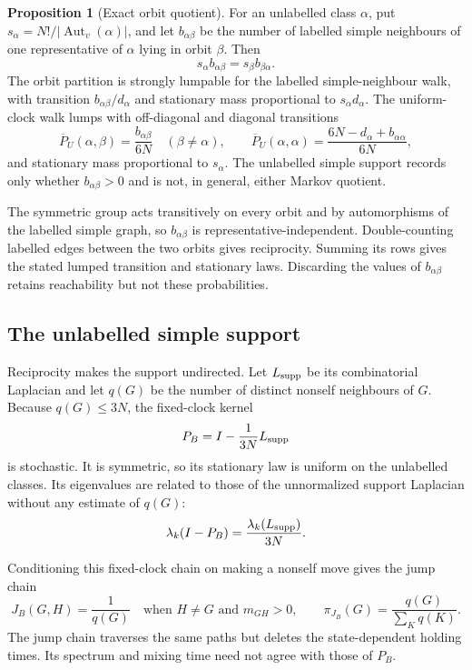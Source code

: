 \documentclass[11pt]{article}
\makeatletter
\newcommand{\Aut}{\operatorname{Aut}}
\theoremstyle{definition}
\newtheorem{proposition}[theorem]{Proposition}
\renewenvironment{proof}[1][\proofname]{\par
  \pushQED{\qed}%
  \normalfont \topsep6\p@\@plus6\p@\relax
  \trivlist
  \item[\hskip\labelsep\bfseries #1\@addpunct{.}]\ignorespaces
}{%
  \popQED\endtrivlist\@endpefalse
}
\makeatother
\begin{document}
\begin{proposition}[Exact orbit quotient]
For an unlabelled class $\alpha$, put
$s_\alpha=N!/|\Aut_v(\alpha)|$, and let $b_{\alpha\beta}$ be the number of
labelled simple neighbours of one representative of $\alpha$ lying in orbit
$\beta$.  Then
\[
 s_\alpha b_{\alpha\beta}=s_\beta b_{\beta\alpha}.
\]
The orbit partition is strongly lumpable for the labelled simple-neighbour
walk, with transition $b_{\alpha\beta}/d_\alpha$ and stationary mass
proportional to $s_\alpha d_\alpha$.  The uniform-clock walk lumps with
off-diagonal and diagonal transitions
\[
 \overline P_U(\alpha,\beta)=\frac{b_{\alpha\beta}}{6N}
 \quad(\beta\ne\alpha),\qquad
 \overline P_U(\alpha,\alpha)
 =\frac{6N-d_\alpha+b_{\alpha\alpha}}{6N},
\]
and stationary mass proportional to $s_\alpha$.  The unlabelled simple support records only whether
$b_{\alpha\beta}>0$ and is not, in general, either Markov quotient.
\end{proposition}

\begin{proof}
The symmetric group acts transitively on every orbit and by automorphisms of
the labelled simple graph, so $b_{\alpha\beta}$ is representative-independent.
Double-counting labelled edges between the two orbits gives reciprocity.
Summing its rows gives the stated lumped transition and stationary laws.
Discarding the values of $b_{\alpha\beta}$ retains reachability but not these
probabilities.
\end{proof}

\subsection{The unlabelled simple support}

Reciprocity makes the support undirected.  Let $L_{\rm supp}$ be its
combinatorial Laplacian and let $q(G)$ be the number of distinct nonself
neighbours of $G$.  Because $q(G)\le3N$, the fixed-clock kernel
\[
 P_B=I-\frac1{3N}L_{\rm supp}
\]
is stochastic.  It is symmetric, so its stationary law is uniform on the
unlabelled classes.  Its eigenvalues are related to those of the unnormalized
support Laplacian without any estimate of $q(G)$:
\[
 \lambda_k(I-P_B)=\frac{\lambda_k(L_{\rm supp})}{3N}.
\]

Conditioning this fixed-clock chain on making a nonself move gives the jump
chain
\[
 J_B(G,H)=\frac1{q(G)}
 \quad\text{when }H\ne G\text{ and }m_{GH}>0,
 \qquad
 \pi_{J_B}(G)=\frac{q(G)}{\sum_Kq(K)}.
\]
The jump chain traverses the same paths but deletes the state-dependent holding
times.  Its spectrum and mixing time need not agree with those of $P_B$.
\end{document}
